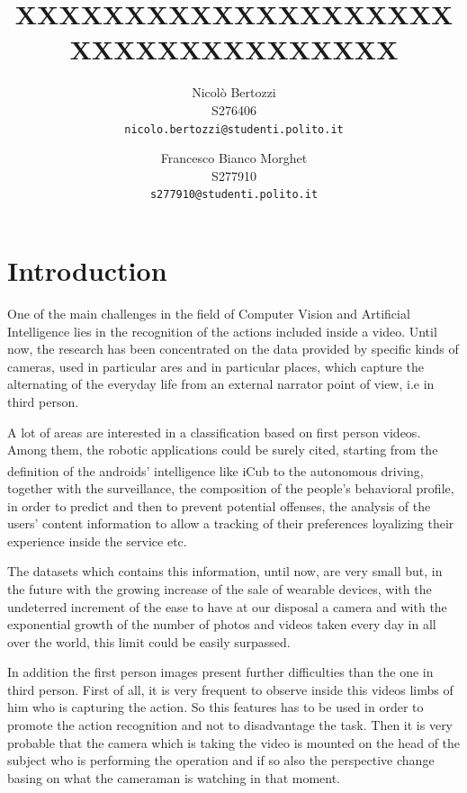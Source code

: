 \documentclass[10pt,twocolumn,letterpaper]{article}
\begin{document}
\title{XXXXXXXXXXXXXXXXXXXXXXXXXXXXXXXXXXX}

\author{Nicolò Bertozzi\\
S276406\\
{\tt\small nicolo.bertozzi@studenti.polito.it}
\and
Francesco Bianco Morghet\\
S277910\\
{\tt\small s277910@studenti.polito.it}
}

\maketitle


\begin{abstract}
\end{abstract}


\section{Introduction}

One of the main challenges in the field of Computer Vision and Artificial Intelligence lies in the recognition of the actions included inside a video. Until now, the research has been concentrated on the data provided by specific kinds of cameras, used in particular ares and in particular places, which capture the alternating of the everyday life from an external narrator point of view, i.e in third person.

A lot of areas are interested in a classification based on first person videos. Among them, the robotic applications could be surely cited, starting from the definition of the androids’ intelligence like iCub\textsuperscript{\textcopyright} to the autonomous driving, together with the surveillance, the composition of the people’s behavioral profile, in order to predict and then to prevent potential offenses, the analysis of the users’ content information to allow a tracking of their preferences loyalizing their experience inside the service etc.

The datasets which contains this information, until now, are very small but, in the future with the growing increase of the sale of wearable devices, with the undeterred increment of the ease to have at our disposal a camera and with the exponential growth of the number of photos and videos taken every day in all over the world, this limit could be easily surpassed. 

In addition the first person images present further difficulties than the one in third person. First of all, it is very frequent to observe inside this videos limbs of him who is capturing the action. So this features has to be used in order to promote the action recognition and not to disadvantage the task. Then it is very probable that the camera which is taking the video is mounted on the head of the subject who is performing the operation and if so also the perspective change basing on what the cameraman is watching in that moment.
\end{document}
